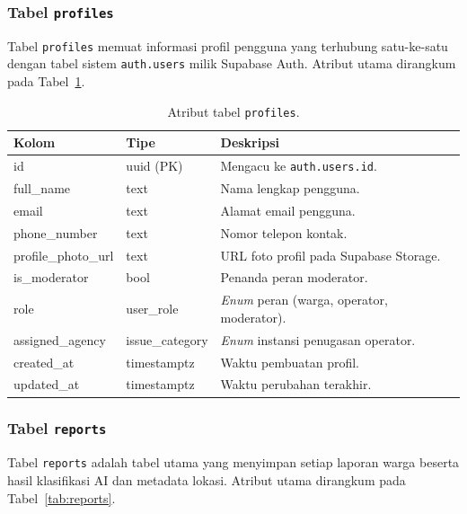 \subsubsection{Tabel \texttt{profiles}}

Tabel \texttt{profiles} memuat informasi profil pengguna yang terhubung satu-ke-satu dengan tabel sistem \texttt{auth.users} milik Supabase Auth. Atribut utama dirangkum pada Tabel~\ref{tab:profiles}.

\begin{table}[htbp]
\centering
\caption{Atribut tabel \texttt{profiles}.}
\label{tab:profiles}
\small
\begin{tabular}{p{3.4cm} p{2.6cm} p{6.5cm}}
\toprule
\textbf{Kolom} & \textbf{Tipe} & \textbf{Deskripsi} \\
\midrule
id & uuid (PK) & Mengacu ke \texttt{auth.users.id}. \\
full\_name & text & Nama lengkap pengguna. \\
email & text & Alamat email pengguna. \\
phone\_number & text & Nomor telepon kontak. \\
profile\_photo\_url & text & URL foto profil pada Supabase Storage. \\
is\_moderator & bool & Penanda peran moderator. \\
role & user\_role & \textit{Enum} peran (warga, operator, moderator). \\
assigned\_agency & issue\_category & \textit{Enum} instansi penugasan operator. \\
created\_at & timestamptz & Waktu pembuatan profil. \\
updated\_at & timestamptz & Waktu perubahan terakhir. \\
\bottomrule
\end{tabular}
\end{table}

\subsubsection{Tabel \texttt{reports}}

Tabel \texttt{reports} adalah tabel utama yang menyimpan setiap laporan warga beserta hasil klasifikasi AI dan metadata lokasi. Atribut utama dirangkum pada Tabel~\ref{tab:reports}.


